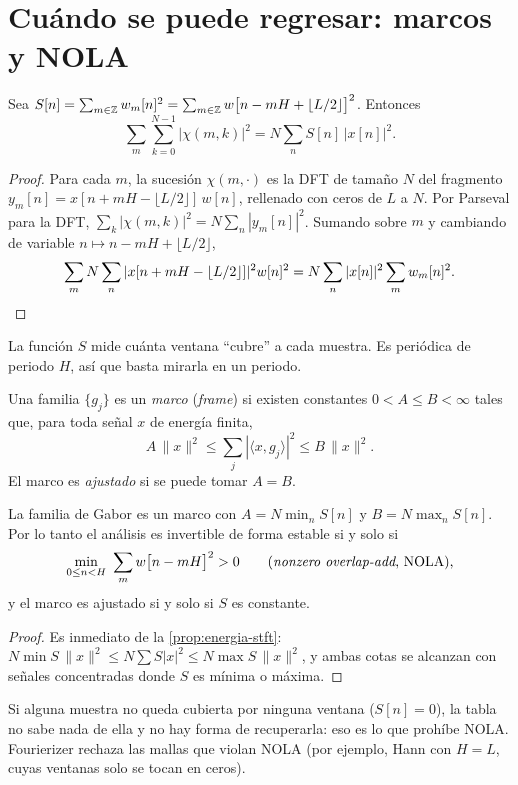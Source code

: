 \section{Cuándo se puede regresar: marcos y NOLA}

\begin{proposicion}\label{prop:energia-stft}
Sea $S[n]=\sum_{m\in\mathbb{Z}}w_m[n]^2=\sum_{m\in\mathbb{Z}}w\bigl[n-mH+\lfloor L/2\rfloor\bigr]^2$. Entonces
\[
  \sum_{m}\sum_{k=0}^{N-1}|\chi(m,k)|^2=N\sum_{n}S[n]\,|x[n]|^2 .
\]
\end{proposicion}

\begin{proof}
Para cada $m$, la sucesión $\chi(m,\cdot)$ es la DFT de tamaño $N$ del fragmento
$y_m[n]=x[n+mH-\lfloor L/2\rfloor]\,w[n]$, rellenado con ceros de $L$ a $N$. Por Parseval para la
DFT, $\sum_k|\chi(m,k)|^2=N\sum_n|y_m[n]|^2$. Sumando sobre $m$ y cambiando de variable
$n\mapsto n-mH+\lfloor L/2\rfloor$,
\[
  \sum_m N\sum_n|x[n+mH-\lfloor L/2\rfloor]|^2w[n]^2=N\sum_n|x[n]|^2\sum_m w_m[n]^2 . \qedhere
\]
\end{proof}

La función $S$ mide cuánta ventana ``cubre'' a cada muestra. Es periódica de periodo $H$, así que
basta mirarla en un periodo.

\begin{definicion}
Una familia $\{g_j\}$ es un \emph{marco} (\emph{frame}) si existen constantes $0<A\le B<\infty$
tales que, para toda señal $x$ de energía finita,
\[
  A\,\|x\|^2\le\sum_j|\langle x,g_j\rangle|^2\le B\,\|x\|^2 .
\]
El marco es \emph{ajustado} si se puede tomar $A=B$.
\end{definicion}

\begin{corolario}[NOLA]\label{cor:nola}
La familia de Gabor es un marco con $A=N\min_n S[n]$ y $B=N\max_n S[n]$. Por lo tanto el análisis
es invertible de forma estable si y solo si
\[
  \min_{0\le n<H}\ \sum_m w\bigl[n-mH\bigr]^2>0
  \qquad\text{(\emph{nonzero overlap-add}, NOLA),}
\]
y el marco es ajustado si y solo si $S$ es constante.
\end{corolario}

\begin{proof}
Es inmediato de la \cref{prop:energia-stft}: $N\min S\,\|x\|^2\le N\sum S|x|^2\le N\max S\,\|x\|^2$,
y ambas cotas se alcanzan con señales concentradas donde $S$ es mínima o máxima.
\end{proof}

Si alguna muestra no queda cubierta por ninguna ventana ($S[n]=0$), la tabla no sabe nada de ella
y no hay forma de recuperarla: eso es lo que prohíbe NOLA. Fourierizer rechaza las mallas que
violan NOLA (por ejemplo, Hann con $H=L$, cuyas ventanas solo se tocan en ceros).

